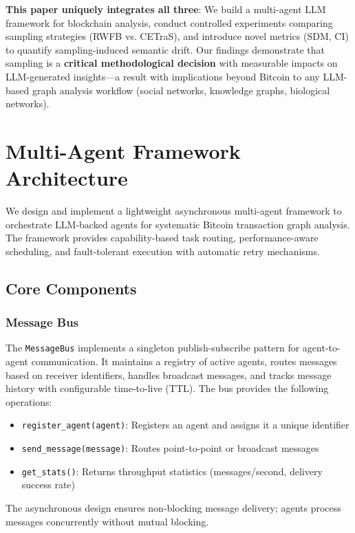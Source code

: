 \textbf{This paper uniquely integrates all three}: We build a multi-agent LLM framework for blockchain analysis, conduct controlled experiments comparing sampling strategies (RWFB vs. CETraS), and introduce novel metrics (SDM, CI) to quantify sampling-induced semantic drift. Our findings demonstrate that sampling is a \textbf{critical methodological decision} with measurable impacts on LLM-generated insights---a result with implications beyond Bitcoin to any LLM-based graph analysis workflow (social networks, knowledge graphs, biological networks).

\section{Multi-Agent Framework Architecture}\label{sec:framework}

We design and implement a lightweight asynchronous multi-agent framework to orchestrate LLM-backed agents for systematic Bitcoin transaction graph analysis. The framework provides capability-based task routing, performance-aware scheduling, and fault-tolerant execution with automatic retry mechanisms.

\subsection{Core Components}

\subsubsection{Message Bus}
The \texttt{MessageBus} implements a singleton publish-subscribe pattern for agent-to-agent communication. It maintains a registry of active agents, routes messages based on receiver identifiers, handles broadcast messages, and tracks message history with configurable time-to-live (TTL). The bus provides the following operations:

\begin{itemize}
    \item \texttt{register\_agent(agent)}: Registers an agent and assigns it a unique identifier
    \item \texttt{send\_message(message)}: Routes point-to-point or broadcast messages  
    \item \texttt{get\_stats()}: Returns throughput statistics (messages/second, delivery success rate)
\end{itemize}

The asynchronous design ensures non-blocking message delivery; agents process messages concurrently without mutual blocking.

